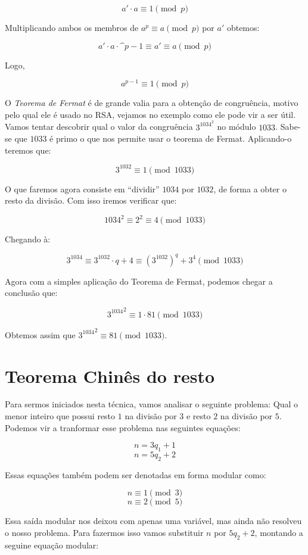 $$a' \cdot a \equiv 1 \pmod{p}$$

Multiplicando ambos os membros de $a^p \equiv a \pmod{p}$ por $a'$ obtemos:

$$a'\cdot a \cdot \^{p-1} \equiv a' \equiv a \pmod{p}$$

Logo,

$$a^{p-1} \equiv 1 \pmod{p}$$
\hfill \newline

O \textit{Teorema de Fermat} \'e de grande valia para a obten\c{c}\~ao de congru\^encia, motivo pelo qual ele \'e usado no RSA, vejamos no exemplo como ele pode vir a ser \'util. Vamos tentar descobrir qual o valor da congru\^encia $3^{1034}^{2}$ no m\'odulo $1033$. Sabe-se que $1033$ \'e primo o que nos permite usar o teorema de Fermat. Aplicando-o teremos que:

$$3^{1032} \equiv 1 \pmod{1033}$$

O que faremos agora consiste em ``dividir'' $1034$ por $1032$, de forma a obter o resto da divis\~ao. Com isso iremos verificar que:

$$1034^2 \equiv 2^2 \equiv 4 \pmod{1033}$$

Chegando \`a:

$$3^{1034} \equiv 3^{1032}\cdot q + 4 \equiv (3^{1032})^{q} + 3^4 \pmod{1033}$$

Agora com a simples aplica\c{c}\~ao do Teorema de Fermat, podemos chegar a conclus\~ao que: 

$${3^{1034}}^2 \equiv 1 \cdot 81 \pmod{1033}$$

Obtemos assim que ${3^{1034}}^{2} \equiv 81 \pmod{1033}$.

\section{Teorema Chin\^es do resto}

\hspace{7mm}Para sermos iniciados nesta t\'ecnica, vamos analisar o seguinte problema: Qual o menor inteiro que possui resto $1$ na divis\~ao por $3$ e resto $2$ na divis\~ao por $5$. Podemos vir a tranformar esse problema nas seguintes equa\c{c}\~oes:

$$n = 3q_1 + 1$$ $$n = 5q_2 + 2$$

Essas equa\c{c}\~oes tamb\'em podem ser denotadas em forma modular como:

$$n \equiv 1\pmod{3}$$ $$n \equiv 2 \pmod{5}$$

Essa sa\'ida modular nos deixou com apenas uma vari\'avel, mas ainda n\~ao resolveu o nosso problema. Para fazermos isso vamos substituir $n$ por $5q_2 + 2$, montando a seguine equa\c{c}\~ao modular:

